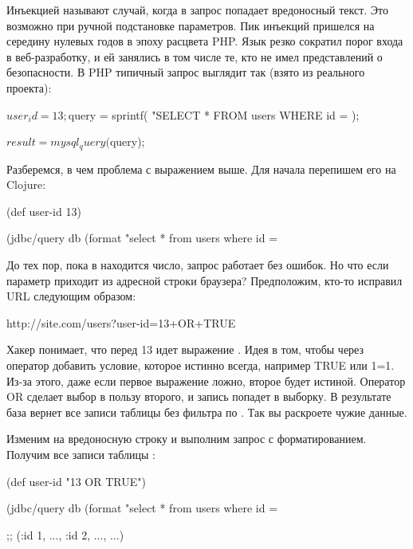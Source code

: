 Инъекцией называют случай, когда в запрос попадает вредоносный текст. Это возможно при ручной подстановке параметров. Пик инъекций пришелся на середину нулевых годов в эпоху расцвета PHP. Язык резко сократил порог входа в веб-разработку, и ей занялись в том числе те, кто не имел представлений о безопасности. В PHP типичный запрос выглядит так (взято из реального проекта):

\begin{english}
  \begin{php}
$user_id = 13;

$query = sprintf(
  "SELECT * FROM users WHERE id = %
);

$result = mysql_query($query);
  \end{php}
\end{english}

Разберемся, в чем проблема с выражением выше. Для начала перепишем его на Clojure:

\begin{english}
  \begin{clojure}
(def user-id 13)

(jdbc/query db
  (format "select * from users where id = %
  \end{clojure}
\end{english}

До тех пор, пока в  находится число, запрос работает без ошибок. Но что если параметр приходит из адресной строки браузера? Предположим, кто-то исправил URL следующим образом:

\begin{english}
  \begin{text}
http://site.com/users?user-id=13+OR+TRUE
  \end{text}
\end{english}

Хакер понимает, что перед 13 идет выражение . Идея в том, чтобы через оператор  добавить условие, которое истинно всегда, например TRUE или 1=1. Из-за этого, даже если первое выражение ложно, второе будет истиной. Оператор OR сделает выбор в пользу второго, и запись попадет в выборку. В результате база вернет все записи таблицы без фильтра по . Так вы раскроете чужие данные.

Изменим  на вредоносную строку и выполним запрос с форматированием. Получим все записи таблицы :

\begin{english}
  \begin{clojure}
(def user-id
  "13 OR TRUE")

(jdbc/query db
  (format "select * from users where id = %

;; ({:id 1, ...}, {:id 2, ...}, ...)
  \end{clojure}
\end{english}

